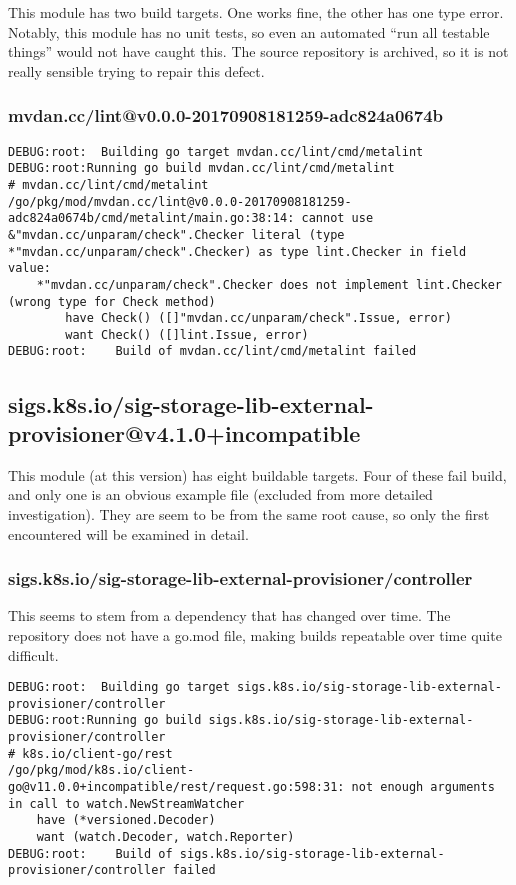 \documentclass[a4paper]{paper}
\begin{document}
This module has two build targets. One works fine, the other has one
type error. Notably, this module has no unit tests, so even an
automated ``run all testable things'' would not have caught this. The
source repository is archived, so it is not really sensible trying to
repair this defect.

\subsubsection{mvdan.cc/lint@v0.0.0-20170908181259-adc824a0674b}
\begin{verbatim}
DEBUG:root:  Building go target mvdan.cc/lint/cmd/metalint
DEBUG:root:Running go build mvdan.cc/lint/cmd/metalint
# mvdan.cc/lint/cmd/metalint
/go/pkg/mod/mvdan.cc/lint@v0.0.0-20170908181259-adc824a0674b/cmd/metalint/main.go:38:14: cannot use &"mvdan.cc/unparam/check".Checker literal (type *"mvdan.cc/unparam/check".Checker) as type lint.Checker in field value:
	*"mvdan.cc/unparam/check".Checker does not implement lint.Checker (wrong type for Check method)
		have Check() ([]"mvdan.cc/unparam/check".Issue, error)
		want Check() ([]lint.Issue, error)
DEBUG:root:    Build of mvdan.cc/lint/cmd/metalint failed
\end{verbatim}

\subsection{sigs.k8s.io/sig-storage-lib-external-provisioner@v4.1.0+incompatible}

This module (at this version) has eight buildable targets. Four of
these fail build, and only one is an obvious example file (excluded from more detailed investigation). They are seem to be from the same root cause, so only the first encountered will be examined in detail.

\subsubsection{sigs.k8s.io/sig-storage-lib-external-provisioner/controller}

This seems to stem from a dependency that has changed over time. The
repository does not have a go.mod file, making builds repeatable over
time quite difficult.

\begin{verbatim}
DEBUG:root:  Building go target sigs.k8s.io/sig-storage-lib-external-provisioner/controller
DEBUG:root:Running go build sigs.k8s.io/sig-storage-lib-external-provisioner/controller
# k8s.io/client-go/rest
/go/pkg/mod/k8s.io/client-go@v11.0.0+incompatible/rest/request.go:598:31: not enough arguments in call to watch.NewStreamWatcher
	have (*versioned.Decoder)
	want (watch.Decoder, watch.Reporter)
DEBUG:root:    Build of sigs.k8s.io/sig-storage-lib-external-provisioner/controller failed
\end{verbatim}
\end{document}
